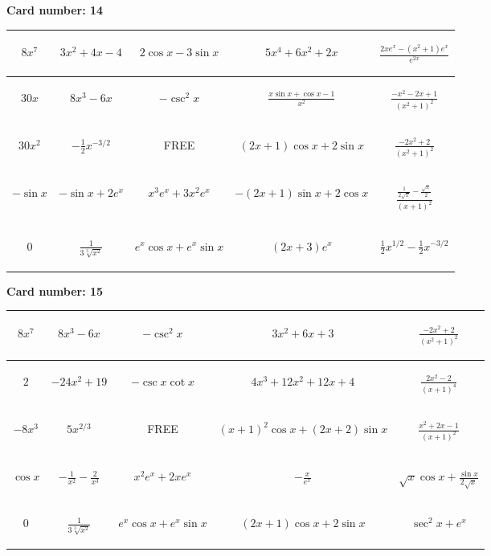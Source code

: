 \documentclass{article}
\newcommand{\entry}[1]{\begin{minipage}[t][2.75cm][t]{4cm} \vspace{1cm} \begin{center}#1\end{center} \end{minipage}}
\newcommand{\freespace}{\entry{FREE}}
\newcommand{\cardnumber}[1]{\noindent \textbf{Card number: #1} \bigskip}
\begin{document}
\pagebreak

\cardnumber{14}
\begin{center}
\begin{tabular}{|*{5}{c|}}
    \hline
    \entry{$8x^7$} & \entry{$3x^2 + 4x - 4$} & \entry{$2 \cos x - 3 \sin x$} & \entry{$5x^4 + 6x^2 + 2x$} & \entry{$\frac{2x e^x - (x^2 + 1) e^x}{e^{2x}}$} \\ \hline
    \entry{$30x$} & \entry{$8x^3 - 6x$} & \entry{$-\csc^2 x$} & \entry{$\frac{x \sin x + \cos x - 1}{x^2}$} & \entry{$\frac{-x^2 - 2x + 1}{(x^2 + 1)^2}$} \\ \hline
    \entry{$30x^2$} & \entry{$-\frac{1}{2} x^{-3/2}$} & \freespace & \entry{$(2x + 1) \cos x + 2 \sin x$} & \entry{$\frac{-2x^2 + 2}{(x^2 + 1)^2}$} \\ \hline
    \entry{$-\sin x$} & \entry{$-\sin x + 2e^x$} & \entry{$x^3 e^x + 3x^2 e^x$} & \entry{$-(2x + 1) \sin x + 2 \cos x$} & \entry{$\frac{\frac{1}{2 \sqrt{x}} - \frac{\sqrt{x}}{2}}{(x + 1)^2}$} \\ \hline
    \entry{$0$} & \entry{$\frac{1}{3\sqrt[3]{x^2}}$} & \entry{$e^x \cos x + e^x \sin x$} & \entry{$(2x + 3) e^x$} & \entry{$\frac{1}{2} x^{1/2} - \frac{1}{2} x^{-3/2}$} \\ \hline
\end{tabular}
\end{center}

\pagebreak

\cardnumber{15}
\begin{center}
\begin{tabular}{|*{5}{c|}}
    \hline
    \entry{$8x^7$} & \entry{$8x^3 - 6x$} & \entry{$-\csc^2 x$} & \entry{$3x^2 + 6x + 3$} & \entry{$\frac{-2x^2 + 2}{(x^2 + 1)^2}$} \\ \hline
    \entry{$2$} & \entry{$-24x^2 + 19$} & \entry{$-\csc x \cot x$} & \entry{$4x^3 + 12x^2 + 12x + 4$} & \entry{$\frac{2x^2 - 2}{(x + 1)^4}$} \\ \hline
    \entry{$-8x^3$} & \entry{$5x^{2/3}$} & \freespace & \entry{$(x + 1)^2 \cos x + (2x + 2) \sin x$} & \entry{$\frac{x^2 + 2x - 1}{(x + 1)^2}$} \\ \hline
    \entry{$\cos x$} & \entry{$-\frac{1}{x^2} - \frac{2}{x^3}$} & \entry{$x^2 e^x + 2x e^x$} & \entry{$-\frac{x}{e^x}$} & \entry{$\sqrt{x} \cos x + \frac{\sin x}{2 \sqrt{x}}$} \\ \hline
    \entry{$0$} & \entry{$\frac{1}{3\sqrt[3]{x^2}}$} & \entry{$e^x \cos x + e^x \sin x$} & \entry{$(2x + 1) \cos x + 2 \sin x$} & \entry{$\sec^2 x + e^x$} \\ \hline
\end{tabular}
\end{center}
\end{document}
